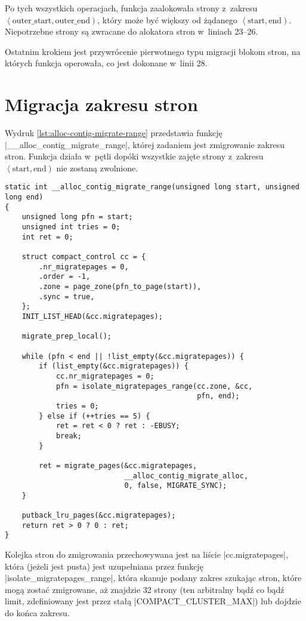 Po tych wszystkich operacjach, funkcja zaalokowała strony z~zakresu
$\left<\mathrm{outer\_start}, \mathrm{outer\_end}\right)$, który może
być większy od żądanego $\left<\mathrm{start}, \mathrm{end}\right)$.
Niepotrzebne strony są zwracane do alokatora stron w~liniach 23--26.

Ostatnim krokiem jest przywrócenie pierwotnego typu migracji blokom
stron, na których funkcja operowała, co jest dokonane w~linii 28.


\section{Migracja zakresu stron}\label{sec:alloc-contig-migrate-range}


Wydruk \ref{lst:alloc-contig-migrate-range} przedstawia funkcję
\code|__alloc_contig_migrate_range|, której zadaniem jest zmigrowanie
zakresu stron.  Funkcja działa w~pętli dopóki wszystkie zajęte strony
z~zakresu $\left<\mathrm{start}, \mathrm{end}\right)$ nie zostaną
zwolnione.


\begin{lstlisting}[float=tb,caption={Skrócony wydruk funkcji
    \code|__alloc_conting_migrate_range| z Linuksa 3.5.},label=lst:alloc-contig-migrate-range]
static int __alloc_contig_migrate_range(unsigned long start, unsigned long end)
{
	unsigned long pfn = start;
	unsigned int tries = 0;
	int ret = 0;

	struct compact_control cc = {
		.nr_migratepages = 0,
		.order = -1,
		.zone = page_zone(pfn_to_page(start)),
		.sync = true,
	};
	INIT_LIST_HEAD(&cc.migratepages);

	migrate_prep_local();

	while (pfn < end || !list_empty(&cc.migratepages)) {
		if (list_empty(&cc.migratepages)) {
			cc.nr_migratepages = 0;
			pfn = isolate_migratepages_range(cc.zone, &cc,
			                                 pfn, end);
			tries = 0;
		} else if (++tries == 5) {
			ret = ret < 0 ? ret : -EBUSY;
			break;
		}

		ret = migrate_pages(&cc.migratepages,
		                    __alloc_contig_migrate_alloc,
		                    0, false, MIGRATE_SYNC);
	}

	putback_lru_pages(&cc.migratepages);
	return ret > 0 ? 0 : ret;
}
\end{lstlisting}

Kolejka stron do zmigrowania przechowywana jest na liście
\code|cc.migratepages|, która (jeżeli jest pusta) jest uzupełniana
przez funkcję \code|isolate_migratepages_range|, która skanuje podany
zakres szukając stron, które mogą zostać zmigrowane, aż znajdzie 32
strony (ten arbitralny bądź co bądź limit, zdefiniowany jest przez
stałą \code|COMPACT_CLUSTER_MAX|) lub dojdzie do końca zakresu.

